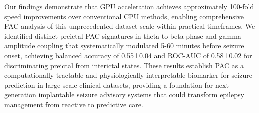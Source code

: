 Our findings demonstrate that GPU acceleration achieves approximately 100-fold speed improvements over conventional CPU methods, enabling comprehensive PAC analysis of this unprecedented dataset scale within practical timeframes. We identified distinct preictal PAC signatures in theta-to-beta phase and gamma amplitude coupling that systematically modulated 5-60 minutes before seizure onset, achieving balanced accuracy of 0.55±0.04 and ROC-AUC of 0.58±0.02 for discriminating preictal from interictal states. These results establish PAC as a computationally tractable and physiologically interpretable biomarker for seizure prediction in large-scale clinical datasets, providing a foundation for next-generation implantable seizure advisory systems that could transform epilepsy management from reactive to predictive care.

\label{sec:introduction}

